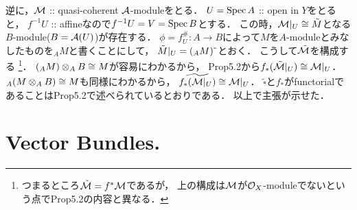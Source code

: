\documentclass[a4paper]{jsarticle}
\begin{document}
    逆に，$\mathcal{M}$ :: quasi-coherent $\mathcal{A}$-moduleをとる．
    $U=\operatorname{Spec} A$ :: open in $Y$をとると，
    $f^{-1}U$ :: affineなので$f^{-1}U=V=\operatorname{Spec} B$とする．
    この時，$\mathcal{M}|_U \cong \tilde{M}$となる$B$-module($B=\mathcal{A}(U)$)が存在する．
    $\phi=f^{\#}_U: A \to B$によって$M$を$A$-moduleとみなしたものを${}_A M$と書くことにして，
    $\tilde{M}|_U=({}_A M)\,\tilde{}\,$とおく．
    こうして$\tilde{\mathcal{M}}$を構成する
    \footnote
    {
        つまるところ$\tilde{\mathcal{M}}=f^* \mathcal{M}$であるが，
        上の構成は$\mathcal{M}$が$\mathcal{O}_X$-moduleでないという点でProp5.2の内容と異なる．
    }．
    $({}_A M) \otimes_A B \cong M$が容易にわかるから，
    Prop5.2から$f_*(\tilde{\mathcal{M}}|_U) \cong \mathcal{M}|_U$．
    ${}_A(M \otimes_A B) \cong M$も同様にわかるから，
    $\widetilde{f_*(\mathcal{M}|_U)} \cong \mathcal{M}|_U$．
    $\tilde{\square}$と$f_*$がfunctorialであることはProp5.2で述べられているとおりである．
    以上で主張が示せた．

\section{Vector Bundles.} %
\end{document}
